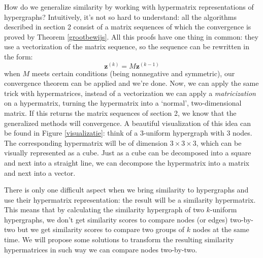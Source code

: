 \documentclass[a4paper,11pt]{report}
\begin{document}
How do we generalize similarity by working with hypermatrix representations of 
hypergraphs? Intuitively, it's not so hard to understand: all the algorithms 
described in section 2 consist of a matrix sequences of which the convergence is 
proved by Theorem \ref{grootbewijs}. All this proofs have one thing in common: 
they use a vectorization of the matrix sequence, so the sequence can be 
rewritten in the form:
$$\mathbf{z}^{(k)} = M\mathbf{z}^{(k-1)}$$
when $M$ meets certain conditions (being nonnegative and symmetric), our 
convergence theorem can be applied and we're done. Now, we can apply the same 
trick with hypermatrices, instead of a vectorization we can apply a \textit{matricization} on a 
hypermatrix, turning the hypermatrix into a `normal', two-dimensional matrix. If 
this returns the matrix sequences of section 2, we know that the generalized 
methods will convergence. A beautiful visualization of this idea can be found in 
Figure \ref{visualizatie}: think of a 3-uniform hypergraph with 3 nodes. The 
corresponding hypermatrix will be of dimension $3 \times 3 \times 3$, which can 
be visually represented as a cube. Just as a cube can be decomposed into a square and next into a straight line, 
we can decompose the hypermatrix into a matrix and next into a vector.

There is only one difficult aspect when we bring similarity to hypergraphs and 
use their hypermatrix representation: the result will be a similarity 
hypermatrix. This means that by calculating the similarity hypergraph of two  $k$-uniform hypergraphs, we don't get similarity scores to compare nodes (or edges) two-by-two
but we get similarity scores to compare two groups of $k$ nodes at the same time. 
We will propose some solutions to transform the resulting similarity hypermatrices 
in such way we can compare nodes two-by-two.
\end{document}
